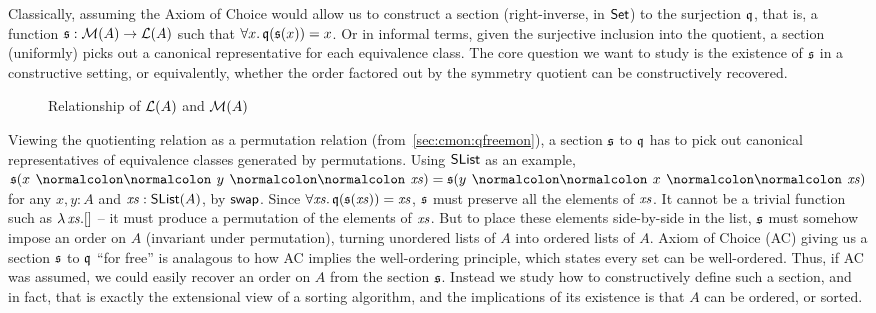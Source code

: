 Classically, assuming the Axiom of Choice would allow us to construct a section ({right-inverse}, in $\mathsf{Set}$) to the surjection $\mathfrak{q}$,
that is,
a function $\mathfrak{s} : \mathcal{M}(A) \to \mathcal{L}(A)$ such that $\forall x.\, \quotient(\ssection(x)) \id x$.
%
Or in informal terms, given the surjective inclusion into the quotient,
a section (uniformly) picks out a canonical representative for each equivalence class.
%
The core question we want to study is the existence of $\mathfrak{s}$ in a constructive
setting, or equivalently, whether the order factored out by the symmetry quotient
can be constructively recovered.
\begin{figure}
    \centering
    \caption{Relationship of $\mathcal{L}(A)$ and $\mathcal{M}(A)$}
    \label{fig:enter-label}
\end{figure}
%
Viewing the quotienting relation as a permutation relation (from~\cref{sec:cmon:qfreemon}), a section $\mathfrak{s}$ to $\mathfrak{q}$ has to pick out
canonical representatives of equivalence classes generated by permutations.
%
Using $\operatorname{\mathsf{SList}}$ as an example,
$\ssection(x \cons y \cons \xs) \id \ssection(y \cons x \cons \xs)$ for any $x, y : A$ and $\mathit{xs} : \operatorname{\mathsf{SList}}(A)$,
by $\operatorname{\mathsf{swap}}$.
%
Since $\forall \xs.\,\quotient(\ssection(\xs)) \id \xs$, $\mathfrak{s}$ must preserve all the elements of $\mathit{xs}$.
It cannot be a trivial function such as $\lambda\,\mathit{xs}. []$ -- it must produce a permutation of the elements of $\mathit{xs}$.
%
But to place these elements side-by-side in the list, $\mathfrak{s}$ must somehow impose an order on $A$
(invariant under permutation), turning unordered lists of $A$ into ordered lists of $A$.
%
Axiom of Choice (AC) giving us a section $\mathfrak{s}$ to $\mathfrak{q}$ ``for free'' is analagous to how
AC implies the well-ordering principle, which states every set can be well-ordered.
%
Thus, if AC was assumed, we could easily recover an order on $A$ from the section $\mathfrak{s}$.
%
Instead we study how to constructively define such a section, and in fact,
that is exactly the extensional view of a sorting algorithm,
and the implications of its existence is that $A$ can be ordered, or sorted.

